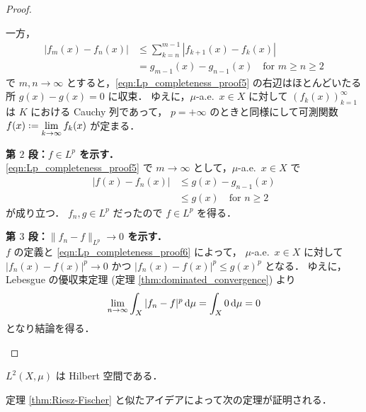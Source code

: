 \begin{proof}
\begin{itemize}[leftmargin=\parindent]
        一方，
        \begin{align}
            |f_m(x)-f_n(x)|
            &\le\sum_{k=n}^{m-1}|f_{k+1}(x)-f_k(x)|\nonumber\\
            &=g_{m-1}(x)-g_{n-1}(x)\quad\text{for $m\ge n\ge2$}\label{eqn:Lp_completeness_proof5}
        \end{align}
        で $m,n\to\infty$ とすると，\eqref{eqn:Lp_completeness_proof5} の右辺はほとんどいたる所 $g(x)-g(x)=0$ に収束．
        ゆえに，$\mu$-a.e.\ $x\in X$ に対して $(f_k(x))_{k=1}^\infty$ は $K$ における Cauchy 列であって，
        $p=+\infty$ のときと同様にして可測関数 $\displaystyle f(x)\defeq\lim_{k\to\infty}f_k(x)$ が定まる．

        \textbf{第 $2$ 段：$f\in L^p$ を示す．}\\
        \eqref{eqn:Lp_completeness_proof5} で $m\to\infty$ として，$\mu$-a.e.\ $x\in X$ で
        \begin{align}
            |f(x)-f_n(x)|
            &\le g(x)-g_{n-1}(x)\nonumber\\
            &\le g(x)\quad\text{for $n\ge2$}\label{eqn:Lp_completeness_proof6}
        \end{align}
        が成り立つ．
        $f_n,g\in L^p$ だったので $f\in L^p$ を得る．

        \textbf{第 $3$ 段：$\|f_n-f\|_{L^p}\to0$ を示す．}\\
        $f$ の定義と \eqref{eqn:Lp_completeness_proof6} によって，
        $\mu$-a.e.\ $x\in X$ に対して $|f_n(x)-f(x)|^p\to0$ かつ $|f_n(x)-f(x)|^p\le g(x)^p$ となる．
        ゆえに，Lebesgue の優収束定理 (定理 \ref{thm:dominated_convergence}) より
        \begin{align*}
            \lim_{n\to\infty}\int_X|f_n-f|^p\,\mathrm{d}\mu
            =\int_X0\,\mathrm{d}\mu=0
        \end{align*}
        となり結論を得る．
    \end{itemize}
\end{proof}

\begin{corollary}
    $L^2(X,\mu)$ は Hilbert 空間である．
\end{corollary}

定理 \ref{thm:Riesz-Fischer} と似たアイデアによって次の定理が証明される．

